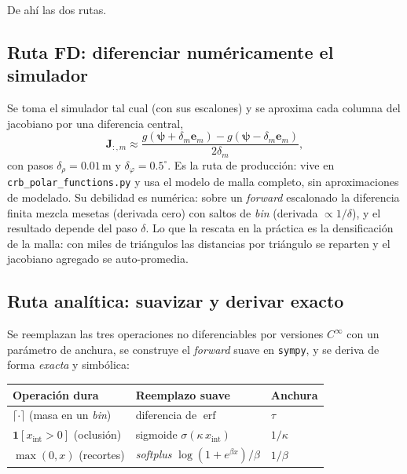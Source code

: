 \documentclass[11pt,a4paper]{article}
\newcommand{\vect}[1]{\boldsymbol{#1}}
\newcommand{\matr}[1]{\mathbf{#1}}
\newcommand{\erf}{\operatorname{erf}}
\newcommand{\code}[1]{\texttt{#1}}
\theoremstyle{definition}
\begin{document}
De ahí las dos rutas.

\subsection{Ruta FD: diferenciar numéricamente el simulador}

Se toma el simulador tal cual (con sus escalones) y se aproxima cada columna
del jacobiano por una diferencia central,
%
\begin{equation}
\matr J_{:,m} \approx \frac{g(\vect\psi+\delta_m \vect e_m) -
                            g(\vect\psi-\delta_m \vect e_m)}{2\delta_m},
\end{equation}
%
con pasos $\delta_\rho = 0.01\,$m y $\delta_\varphi = 0.5^\circ$. Es la ruta de
producción: vive en \code{crb\_polar\_functions.py} y usa el modelo de malla
completo, sin aproximaciones de modelado. Su debilidad es numérica: sobre un
\emph{forward} escalonado la diferencia finita mezcla mesetas (derivada cero)
con saltos de \emph{bin} (derivada $\propto 1/\delta$), y el resultado depende
del paso $\delta$. Lo que la rescata en la práctica es la densificación de la
malla: con miles de triángulos las distancias por triángulo se reparten y el
jacobiano agregado se auto-promedia.

\subsection{Ruta analítica: suavizar y derivar exacto}

Se reemplazan las tres operaciones no diferenciables por versiones $C^\infty$
con un parámetro de anchura, se construye el \emph{forward} suave en
\code{sympy}, y se deriva de forma \emph{exacta} y simbólica:
%
\begin{center}
\begin{tabular}{@{}lll@{}}
\toprule
Operación dura & Reemplazo suave & Anchura \\
\midrule
$\lceil\cdot\rceil$ (masa en un \emph{bin}) &
  diferencia de $\erf$ &
  $\tau$ \\
$\mathbf 1[x_{\text{int}}>0]$ (oclusión) &
  sigmoide $\sigma(\kappa\, x_{\text{int}})$ &
  $1/\kappa$ \\
$\max(0,x)$ (recortes) &
  \emph{softplus} $\log(1+e^{\beta x})/\beta$ &
  $1/\beta$ \\
\bottomrule
\end{tabular}
\end{center}
\end{document}
